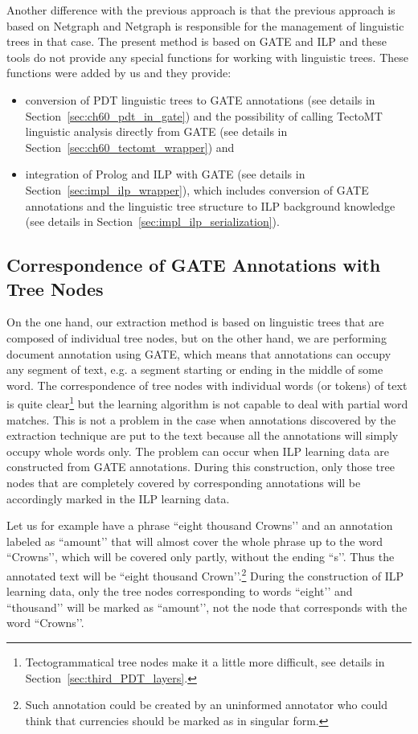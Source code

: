 Another difference with the previous approach is that the previous approach is based on Netgraph and Netgraph is responsible for the management of linguistic trees in that case. The present method is based on GATE and ILP and these tools do not provide any special functions for working with linguistic trees. These functions were added by us and they provide:
\begin{itemize}	
	\item conversion of PDT linguistic trees to GATE annotations (see details in Section~\ref{sec:ch60_pdt_in_gate}) and the possibility of calling TectoMT linguistic analysis directly from GATE (see details in Section~\ref{sec:ch60_tectomt_wrapper}) and
	
	\item integration of Prolog and ILP with GATE (see details in Section~\ref{sec:impl_ilp_wrapper}), which includes conversion of GATE annotations and the linguistic tree structure to ILP background knowledge (see details in Section~\ref{sec:impl_ilp_serialization}).
\end{itemize}





\subsection{Correspondence of GATE Annotations with Tree Nodes}

On the one hand, our extraction method is based on linguistic trees that are composed of individual tree nodes, but on the other hand, we are performing document annotation using GATE, which means that annotations can occupy any segment of text, e.g. a segment starting or ending in the middle of some word. The correspondence of tree nodes with individual words (or tokens) of text is quite clear\footnote{Tectogrammatical tree nodes make it a little more difficult, see details in Section~\ref{sec:third_PDT_layers}.} but the learning algorithm is not capable to deal with partial word matches. This is not a problem in the case when annotations discovered by the extraction technique are put to the text because all the annotations will simply occupy whole words only. The problem can occur when ILP learning data are constructed from GATE annotations. During this construction, only those tree nodes that are completely covered by corresponding annotations will be accordingly marked in the ILP learning data.

Let us for example have a phrase ``eight thousand Crowns’’ and an annotation labeled as ``amount’’ that will almost cover the whole phrase up to the word ``Crowns’’, which will be covered only partly, without the ending ``s’’. Thus the annotated text will be ``eight thousand Crown’’.\footnote{Such annotation could be created by an uninformed annotator who could think that currencies should be marked as in singular form.} During the construction of ILP learning data, only the tree nodes corresponding to words ``eight’’ and ``thousand’’ will be marked as ``amount’’, not the node that corresponds with the word ``Crowns’’.

